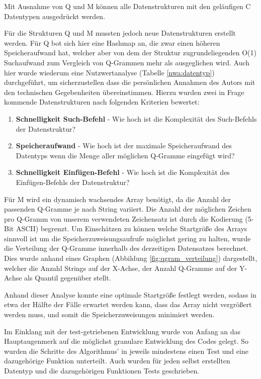 Mit Ausnahme von Q und M können alle Datenstrukturen mit den geläufigen C
Datentypen ausgedrückt werden.

Für die Strukturen Q und M mussten jedoch neue Datenstrukturen
erstellt werden. Für Q bot sich hier eine Hashmap an, die zwar einen höheren Speicheraufwand hat, welcher aber von dem der Struktur zugrundeliegenden
O(1) Suchaufwand zum Vergleich von Q-Grammen mehr als ausgeglichen wird. Auch hier wurde wiederum eine Nutzwertanalyse (Tabelle \ref{nwa:datentyp}) durchgeführt,
um sicherzustellen dass die persönlichen Annahmen des Autors mit den technischen
Gegebenheiten übereinstimmen.
Hierzu wurden zwei in Frage kommende Datenstrukturen nach folgenden Kriterien bewertet:

\begin{enumerate}
	\item \textbf{Schnelligkeit Such-Befehl} - Wie hoch ist die Komplexität des Such-Befehls der Datenstruktur?
    \item \textbf{Speicheraufwand} - Wie hoch ist der maximale Speicheraufwand des Datentyps wenn die Menge aller möglichen Q-Gramme eingefügt wird?
    \item \textbf{Schnelligkeit Einfügen-Befehl} - Wie hoch ist die Komplexität des Einfügen-Befehls der Datenstruktur?\\

\end{enumerate}

Für M wird ein dynamisch wachsendes Array benötigt, da die Anzahl der passenden
Q-Gramme je nach String variiert. Die Anzahl der möglichen Zeichen pro Q-Gramm von unserem verwendeten Zeichensatz ist durch die Kodierung (5-Bit ASCII) begrenzt. Um Einschätzen zu können welche Startgröße des Arrays sinnvoll ist um die Speicherzuweisungsaufrufe möglichst gering zu halten, wurde die Verteilung der Q-Gramme innerhalb des derzeitigen Datensatzes berechnet. Dies wurde anhand eines
Graphen (Abbildung \ref{fig:qgram_verteilung}) dargestellt, welcher die Anzahl Strings auf der X-Achse, der Anzahl Q-Gramme auf der Y-Achse als Quantil gegenüber stellt.

Anhand dieser Analyse konnte eine optimale Startgröße festlegt werden, sodass in etwa der Hälfte der Fälle
erwartet werden kann, dass das Array nicht vergrößert werden muss, und somit die
Speicherzuweisungen minimiert werden.


Im Einklang mit der test-getriebenen Entwicklung wurde von Anfang an das Hauptaugenmerk
auf die möglichst granulare Entwicklung des Codes gelegt. So wurden die Schritte
des Algorithmus' in jeweils mindestens einen Test und eine dazugehörige Funktion unterteilt.
Auch wurden für jeden selbst erstellten Datentyp und die dazugehörigen Funktionen Tests geschrieben.

